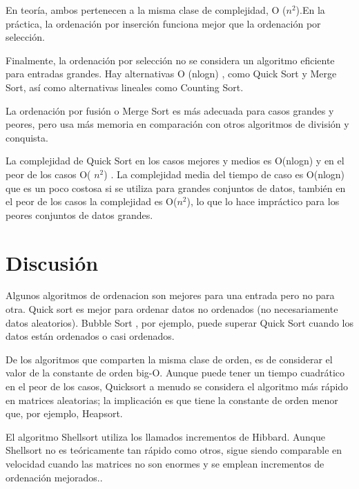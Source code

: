 \documentclass[a4paper]{article}
\begin{document}
En teoría, ambos pertenecen a la misma clase de complejidad, O ($n^{2}$).En la práctica, la ordenación por inserción funciona mejor que la ordenación por selección.

Finalmente, la ordenación por selección no se considera un algoritmo eficiente para entradas grandes. Hay alternativas O (nlogn)
, como Quick Sort y Merge Sort, así como alternativas lineales como Counting Sort. 


La ordenación por fusión o Merge Sort es más adecuada para casos grandes y peores, pero usa más memoria en comparación con otros algoritmos de división y conquista.

\cite{rin}

La complejidad de Quick Sort en los casos mejores y medios  es O(nlogn) y en el peor de los casos O( $n^{2}$)  . La complejidad media del tiempo de caso es O(nlogn) que es un poco costosa si se utiliza para grandes conjuntos de datos, también en el peor de los casos la complejidad es O($n^{2}$), lo que lo hace impráctico para los peores conjuntos de datos grandes.

\section{Discusión}


Algunos algoritmos de ordenacion son mejores para una entrada  pero no para otra. Quick sort es mejor para ordenar datos no ordenados (no necesariamente datos aleatorios). Bubble Sort , por ejemplo, puede superar Quick Sort cuando los datos están ordenados o casi ordenados. 

De los algoritmos que comparten la misma clase de orden, es de considerar el valor de la constante de orden big-O. Aunque puede tener un tiempo cuadrático en el peor de los casos, Quicksort a menudo se considera el algoritmo más rápido en matrices aleatorias; la implicación es que tiene la constante de orden menor que, por ejemplo, Heapsort.


El algoritmo Shellsort  utiliza los llamados incrementos de Hibbard. Aunque Shellsort no es teóricamente tan rápido como otros, sigue siendo comparable en velocidad cuando las matrices no son enormes y se emplean incrementos de ordenación mejorados.\cite{mas}.




\end{document}
